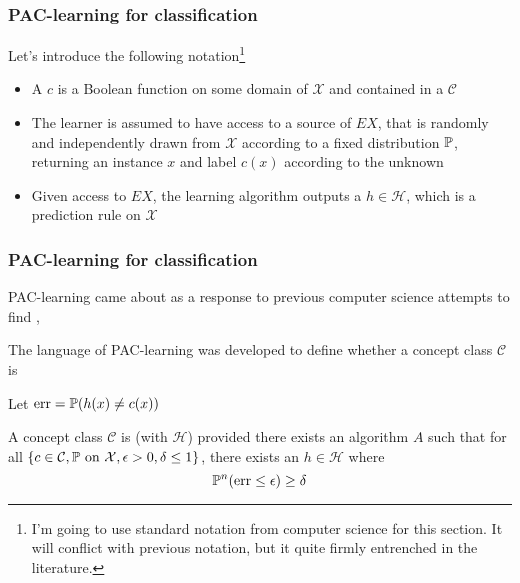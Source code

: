 \documentclass[12pt]{beamer}
\begin{document}
\begin{frame}[fragile]
\frametitle{PAC-learning for classification}
Let's introduce the following notation\footnote{I'm going to use standard notation from computer science
for this section.  It will conflict with previous notation, but it quite firmly entrenched in the literature.}
\begin{itemize}
\item A  $c$ is a Boolean function on some domain of  $\mathcal{X}$
and contained in a  $\mathcal{C}$


\item The learner is assumed to have access to a source of  $EX$, that is randomly
and independently drawn from $\mathcal{X}$ according to a fixed distribution $\P$, returning an instance $x$
and label $c(x)$ according to the unknown 

\item Given access to $EX$, the learning algorithm outputs a  $h \in \mathcal{H}$, which is a 
prediction rule on $\mathcal{X}$
\end{itemize}
\end{frame}

%

\begin{frame}[fragile]
\frametitle{PAC-learning for classification}
PAC-learning came about as a response to previous computer science attempts to find ,


\vsp
The language of PAC-learning was developed to define whether a concept class $\mathcal{C}$ is 

\vsp
Let $\textrm{err} = \P(h(x) \neq c(x))$

\vsp

A concept class $\mathcal{C}$ is  (with $\mathcal{H}$) provided there exists an algorithm $A$ such that 
for all $\{c \in \mathcal{C}, \P \textrm{ on } \mathcal{X}, \epsilon > 0, \delta \leq 1\}$, there exists an $h \in \mathcal{H}$ where
\[
\P^n (\textrm{err} \leq \epsilon) \geq \delta
\]
%
\end{frame}
\end{document}
